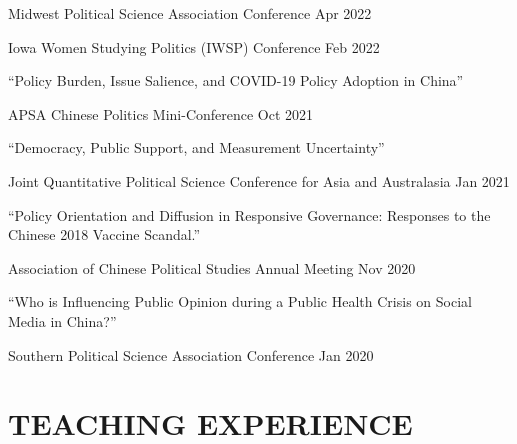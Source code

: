 \documentclass[10.5pt,]{article}
\providecommand{\tightlist}{%
	\setlength{\itemsep}{0pt}\setlength{\parskip}{0pt}}
\renewenvironment{itemize}{
	\begin{list}{}{
			\setlength{\leftmargin}{1.5em}
		}
	}{
	\end{list}
}
\begin{document}
\begin{itemize}
  \begin{itemize}
  \tightlist
  \item
    Midwest Political Science Association Conference \hfill Apr 2022
  \item
    Iowa Women Studying Politics (IWSP) Conference \hfill Feb 2022
  \end{itemize}
\item
  ``Policy Burden, Issue Salience, and COVID-19 Policy Adoption in
  China''

  \begin{itemize}
  \tightlist
  \item
    APSA Chinese Politics Mini-Conference \hfill Oct 2021
  \end{itemize}
\item
  ``Democracy, Public Support, and Measurement Uncertainty''

  \begin{itemize}
  \tightlist
  \item
    Joint Quantitative Political Science Conference for Asia and
    Australasia \hfill Jan 2021
  \end{itemize}
\item
  ``Policy Orientation and Diffusion in Responsive Governance: Responses
  to the Chinese 2018 Vaccine Scandal.''

  \begin{itemize}
  \tightlist
  \item
    Association of Chinese Political Studies Annual Meeting \hfill Nov
    2020
  \end{itemize}
\item
  ``Who is Influencing Public Opinion during a Public Health Crisis on
  Social Media in China?''

  \begin{itemize}
  \tightlist
  \item
    Southern Political Science Association Conference \hfill  Jan 2020
  \end{itemize}
\end{itemize}

\section{TEACHING EXPERIENCE}\label{teaching-experience}
\end{document}
